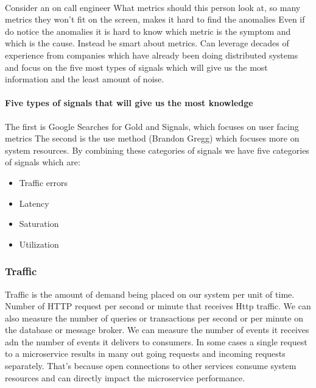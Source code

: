 \paragraph{}
Consider an on call engineer
What metrics should this person look at, so many metrics they won't fit on the screen, makes it hard to find the anomalies
Even if do notice the anomalies it is hard to know which metric is the symptom and which is the cause.
Instead be smart about metrics.
Can leverage decades of experience from companies which have already been doing distributed systems and focus on the five most types of signals which will give us the most information and the least amount of noise.

\paragraph{Five types of signals that will give us the most knowledge}
The first is Google Searches for Gold and Signals, which focuses on user facing metrics
The second is the use method (Brandon Gregg) which focuses more on system resources.
By combining these categories of signals we have five categories of signals which are:

\begin{itemize}
    \item Traffic errors
    \item Latency
    \item Saturation
    \item Utilization
\end{itemize}

\subsubsection{Traffic}
Traffic is the amount of demand being placed on our system per unit of time.
Number of HTTP request per second or minute that receives Http traffic.
We can also measure the number of queries or transactions per second or per minute on the database or message broker.
We can measure the number of events it receives adn the number of events it delivers to consumers.
In some cases a single request to a microservice results in many out going requests and incoming requests separately.
That's because open connections to other services consume system resources and can directly impact the microservice performance.

